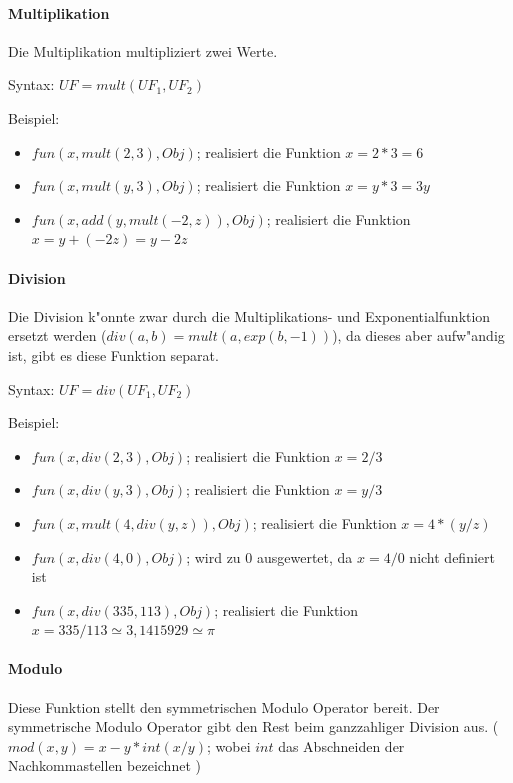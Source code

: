 \paragraph{Multiplikation}

Die Multiplikation multipliziert zwei Werte.

\bigskip\noindent
Syntax:
$UF=mult( UF_1, UF_2 )$

\bigskip\noindent
Beispiel:
\begin{itemize}
 \item $fun(x, mult( 2, 3), Obj)$; realisiert die Funktion $x=2*3=6$
 \item $fun(x, mult( y, 3), Obj)$; realisiert die Funktion $x=y*3=3y$
 \item $fun(x, add( y, mult( -2, z ) ), Obj)$; realisiert die Funktion $x=y+(-2z)=y-2z$
\end{itemize}

\paragraph{Division}

Die Division k"onnte zwar durch die Multiplikations- und Exponentialfunktion ersetzt werden ($div(a,b)=mult( a, exp(b,-1) )$), da dieses aber aufw"andig ist, gibt es diese Funktion separat.

\bigskip\noindent
Syntax:
$UF=div( UF_1, UF_2 )$

\bigskip\noindent
Beispiel:
\begin{itemize}
 \item $fun(x, div( 2, 3 ), Obj)$; realisiert die Funktion $x=2/3$
 \item $fun(x, div( y, 3 ), Obj)$; realisiert die Funktion $x=y/3$
 \item $fun(x, mult( 4, div( y, z ) ), Obj)$; realisiert die Funktion $x=4*(y/z)$
 \item $fun(x, div( 4, 0 ), Obj)$; wird zu $0$ ausgewertet, da $x=4/0$ nicht definiert ist
 \item $fun(x, div( 335, 113 ), Obj)$; realisiert die Funktion $x=335/113 \simeq 3{,}1415929 \simeq \pi$
\end{itemize}


\paragraph{Modulo}

Diese Funktion stellt den symmetrischen Modulo Operator bereit. Der symmetrische Modulo Operator gibt den Rest beim ganzzahliger Division aus.
( $mod( x, y ) = x - y * int(x/y)$; wobei $int$ das Abschneiden der Nachkommastellen bezeichnet )

